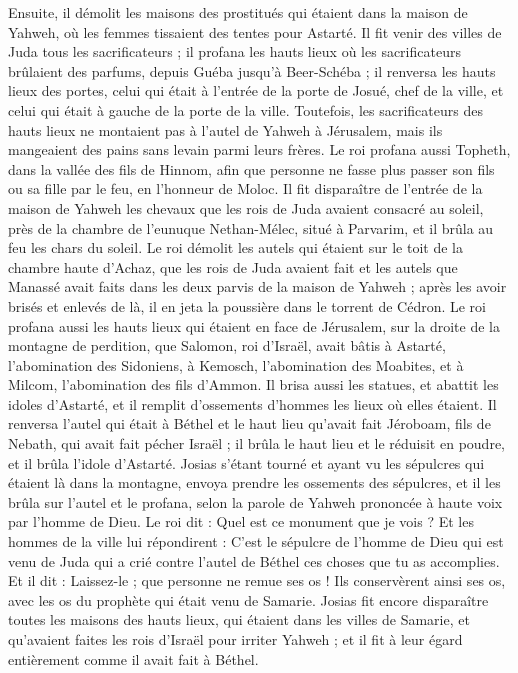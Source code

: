 \begin{multicols}{2}
Ensuite, il démolit les maisons des prostitués qui étaient dans la maison de Yahweh, où les femmes tissaient des tentes pour Astarté.
Il fit venir des villes de Juda tous les sacrificateurs ; il profana les hauts lieux où les sacrificateurs brûlaient des parfums, depuis Guéba jusqu'à Beer-Schéba ; il renversa les hauts lieux des portes, celui qui était à l'entrée de la porte de Josué, chef de la ville, et celui qui était à gauche de la porte de la ville.
Toutefois, les sacrificateurs des hauts lieux ne montaient pas à l'autel de Yahweh à Jérusalem, mais ils mangeaient des pains sans levain parmi leurs frères.
Le roi profana aussi Topheth, dans la vallée des fils de Hinnom, afin que personne ne fasse plus passer son fils ou sa fille par le feu, en l'honneur de Moloc.
Il fit disparaître de l'entrée de la maison de Yahweh les chevaux que les rois de Juda avaient consacré au soleil, près de la chambre de l'eunuque Nethan-Mélec, situé à Parvarim, et il brûla au feu les chars du soleil.
Le roi démolit les autels qui étaient sur le toit de la chambre haute d'Achaz, que les rois de Juda avaient fait et les autels que Manassé avait faits dans les deux parvis de la maison de Yahweh ; après les avoir brisés et enlevés de là, il en jeta la poussière dans le torrent de Cédron.
Le roi profana aussi les hauts lieux qui étaient en face de Jérusalem, sur la droite de la montagne de perdition, que Salomon, roi d'Israël, avait bâtis à Astarté, l'abomination des Sidoniens, à Kemosch, l'abomination des Moabites, et à Milcom, l'abomination des fils d'Ammon.
Il brisa aussi les statues, et abattit les idoles d'Astarté, et il remplit d'ossements d'hommes les lieux où elles étaient.
Il renversa l'autel qui était à Béthel et le haut lieu qu'avait fait Jéroboam, fils de Nebath, qui avait fait pécher Israël ; il brûla le haut lieu et le réduisit en poudre, et il brûla l'idole d'Astarté.
Josias s'étant tourné et ayant vu les sépulcres qui étaient là dans la montagne, envoya prendre les ossements des sépulcres, et il les brûla sur l'autel et le profana, selon la parole de Yahweh prononcée à haute voix par l'homme de Dieu.
Le roi dit : Quel est ce monument que je vois ? Et les hommes de la ville lui répondirent : C'est le sépulcre de l'homme de Dieu qui est venu de Juda qui a crié contre l'autel de Béthel ces choses que tu as accomplies.
Et il dit : Laissez-le ; que personne ne remue ses os ! Ils conservèrent ainsi ses os, avec les os du prophète qui était venu de Samarie.
Josias fit encore disparaître toutes les maisons des hauts lieux, qui étaient dans les villes de Samarie, et qu'avaient faites les rois d'Israël pour irriter Yahweh ; et il fit à leur égard entièrement comme il avait fait à Béthel.

\end{multicols}
